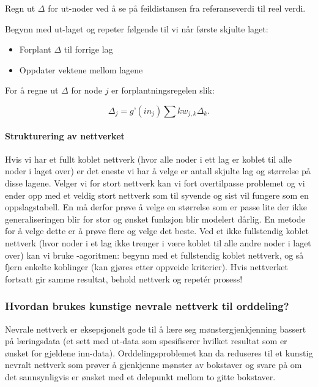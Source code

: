 \begin{items}
\item Regn ut $\Delta$ for ut-noder ved å se på feildistansen fra referanseverdi til reel verdi.
\item Begynn med ut-laget og repeter følgende til vi når første skjulte laget:
\begin{itemize}
\item Forplant $\Delta$ til forrige lag
\item Oppdater vektene mellom lagene
\end{itemize}
\end{items}

For å regne ut $\Delta$ for node $j$ er forplantningsregelen slik:

\begin{equation}
\Delta_j = g’(in_j)\sum\limits{k}w_{j,k}\Delta_{k}.
\end{equation}

\paragraph{Strukturering av nettverket} Hvis vi har et fullt koblet nettverk (hvor alle noder i ett lag er koblet til alle noder i laget over) er det eneste vi har å velge er antall skjulte lag og størrelse på disse lagene. Velger vi for stort nettverk kan vi fort overtilpasse problemet og vi ender opp med et veldig stort nettverk som til syvende og sist vil fungere som en oppslagstabell. En må derfor prøve å velge en størrelse som er passe lite der ikke generaliseringen blir for stor og ønsket funksjon blir modelert dårlig. En metode for å velge dette er å prøve flere og velge det beste. Ved et ikke fullstendig koblet nettverk (hvor noder i et lag ikke trenger i være koblet til alle andre noder i laget over) kan vi bruke -agoritmen: begynn med et fullstendig koblet nettverk, og så fjern enkelte koblinger (kan gjøres etter oppveide kriterier). Hvis nettverket fortsatt gir samme resultat, behold nettverk og repetér prosess!

\subsubsection{Hvordan brukes kunstige nevrale nettverk til orddeling?}

Nevrale nettverk er eksepsjonelt gode til å lære seg mønstergjenkjenning bassert på læringsdata (et sett med ut-data som spesifiserer hvilket resultat som er ønsket for gjeldene inn-data). Orddelingsproblemet kan da reduseres til et kunstig nevralt nettverk som prøver å gjenkjenne mønster av bokstaver og svare på om det sannsynligvis er ønsket med et delepunkt mellom to gitte bokstaver.

